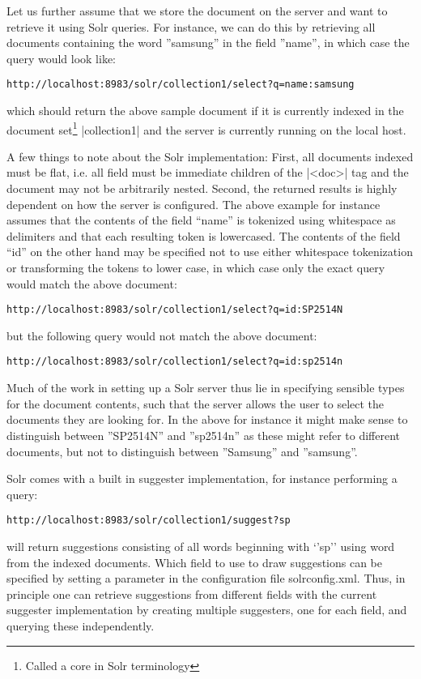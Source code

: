 Let us further assume that we store the document on the server and want to retrieve it using Solr queries. For instance, we can do this by retrieving all documents containing the word ''samsung'' in the field ''name'', in which case the query would look like:

\begin{verbatim}
http://localhost:8983/solr/collection1/select?q=name:samsung
\end{verbatim}

\noindent which should return the above sample document if it is currently indexed in the document set\footnote{Called a core in Solr terminology} |collection1| and the server is currently running on the local host.

A few things to note about the Solr implementation: First, all documents indexed must be flat, i.e. all  field must be immediate children of the |<doc>| tag and the document may not be arbitrarily nested. Second, the returned results is highly dependent on how the server is configured. The above example for instance assumes that the contents of the field “name” is tokenized using whitespace as delimiters and that each resulting token is lowercased. The contents of the field “id” on the other hand may be specified not to use either whitespace tokenization or transforming the tokens to lower case, in which case only the exact query would match the above document:

\begin{verbatim}
http://localhost:8983/solr/collection1/select?q=id:SP2514N
\end{verbatim}

\noindent but the following query would not match the above document:

\begin{verbatim}
http://localhost:8983/solr/collection1/select?q=id:sp2514n
\end{verbatim}

Much of the work in setting up a Solr server thus lie in specifying sensible types for the document contents, such that the server allows the user to select the documents they are looking for. In the above for instance it might make sense to distinguish between ''SP2514N'' and ''sp2514n'' as these might refer to different documents, but not to distinguish between ''Samsung'' and ''samsung''.

Solr comes with a built in suggester implementation, for instance performing a query:

\begin{verbatim}
http://localhost:8983/solr/collection1/suggest?sp
\end{verbatim}

\noindent will return suggestions consisting of all words beginning with ‘’sp’’ using word from the indexed documents. Which field to use to draw suggestions can be specified by setting a parameter in the configuration file solrconfig.xml. Thus, in principle one can retrieve suggestions from different fields with the current suggester implementation by creating multiple suggesters, one for each field, and querying these independently.






